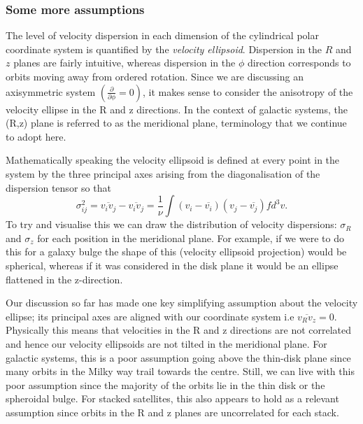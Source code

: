 \subsubsection{Some more assumptions}
The level of velocity dispersion in each dimension of the cylindrical polar coordinate system is quantified by the \textit{velocity ellipsoid}. Dispersion in the $R$ and $z$ planes are fairly intuitive, whereas dispersion in the $\phi$ direction corresponds to orbits moving away from ordered rotation. Since we are discussing an axisymmetric system $(\frac{\partial }{\partial \phi} = 0)$, it makes sense to consider the anisotropy of the velocity ellipse in the R and z directions. In the context of galactic systems, the (R,z) plane is referred to as the meridional plane, terminology that we continue to adopt here.

Mathematically speaking the velocity ellipsoid is defined at every point in the system by the three principal axes arising from the diagonalisation of the dispersion tensor so that
\begin{equation}
\sigma_{ij}^{2} = \overline{v_i v_j} - \overline{v_i v_j} = \frac{1}{\nu} \int (v_i - \overline{v_i})(v_j - \overline{v_j}) f d^3 v.
\end{equation}
To try and visualise this we can draw the distribution of velocity dispersions: $\sigma_R$ and $\sigma_z$ for each position in the meridional plane. For example, if we were to do this for a galaxy bulge the shape of this (velocity ellipsoid projection) would be spherical, whereas if it was considered in the disk plane it would be an ellipse flattened in the z-direction. 

Our discussion so far has made one key simplifying assumption about the velocity ellipse; its principal axes are aligned with our coordinate system i.e $\overline{v_R v_z} = 0$. Physically this means that velocities in the R and z directions are not correlated and hence our velocity ellipsoids are not tilted in the meridional plane. For galactic systems, this is a poor assumption going above the thin-disk plane since many orbits in the Milky way trail towards the centre. Still, we can live with this poor assumption since the majority of the orbits lie in the thin disk or the spheroidal bulge. For stacked satellites, this also appears to hold as a relevant assumption since orbits in the R and z planes are uncorrelated for each stack.

